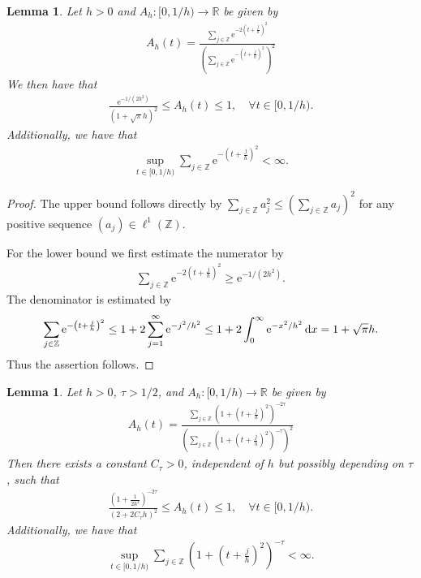 \documentclass{article}
\renewcommand{\d}{\, \textup{d}}
\newtheorem{lemma}[theorem]{Lemma}
\newcommand{\R}{\mathbb{R}}
\newcommand{\Z}{\mathbb{Z}}
\newcommand{\e}{\mathrm{e}}
\begin{document}
\begin{appendices}
\begin{lemma}\label{lem:Gaussianupperandlowerbound}
Let $h>0$ and $A_h:[0,1/h) \to \R$ be given by  
\begin{align*}
    A_h(t)=\frac{\sum_{j \in \Z} \e^{-2\left(t+\frac{j}{h}\right)^2}}{\left(\sum_{j \in \Z} \e^{-\left(t+\frac{j}{h} \right)^2} \right)^2}
\end{align*}
We then have that 
\begin{align*}
    \frac{\e^{-1/(2h^2)}}{(1+\sqrt{\pi}h)^2} \leq A_h(t) \leq 1, \quad \forall t \in[0,1/h).
\end{align*}
Additionally, we have that
\begin{align*}
    \sup_{t \in [0,1/h)} \sum_{j \in \Z} \e^{-\left(t+\frac{j}{h} \right)^2} < \infty.
\end{align*}
\end{lemma}
\begin{proof}
    The upper bound follows directly by $\sum_{j \in \Z} a_j^2 \leq \left( \sum_{j \in \Z} a_j\right)^2$ for any positive sequence $(a_j) \in \ell^1(\Z)$. 

    For the lower bound we first estimate the numerator by 
    \begin{align*}
        \sum_{j \in \Z} \e^{-2\left(t+\frac{j}{h}\right)^2} \geq \e^{-1/(2h^2)}. 
    \end{align*}
    The denominator is estimated by 
    \begin{align*}
        \sum_{j \in \Z} \e^{-\left(t+\frac{j}{h} \right)^2} \leq 1+2 \sum_{j=1}^\infty \e^{-j^2/h^2} \leq 1 + 2 \int_0^\infty \e^{-x^2/h^2} \d x = 1+ \sqrt{\pi} h.
    \end{align*}
Thus the assertion follows.
\end{proof}

\begin{lemma}\label{lem:Sobolevupperandlowerbound}
Let $h>0$, $\tau>1/2$, and $A_h:[0,1/h) \to \R$ be given by
\begin{align*}
    A_h(t)= \frac{\sum_{j \in \Z} \left(1+\left(t+\frac{j}{h}\right)^2\right)^{-2\tau}}{\left(\sum_{j \in \Z} \left( 1+\left(t+\frac{j}{h}\right)^2\right)^{-\tau} \right)^2}
\end{align*}    
Then there exists a constant $C_\tau>0$, independent of $h$ but possibly depending on $\tau$, such that
\begin{align*}
\frac{\left( 1+ \frac{1}{2h^2} \right)^{-2\tau}}{(2+2C_\tau h)^2}    \leq A_h(t) \leq 1, \quad \forall t \in [0,1/h).
\end{align*}
Additionally, we have that
\begin{align*}
    \sup_{t \in [0,1/h)} \sum_{j \in \Z} \left( 1+\left(t+\frac{j}{h}\right)^2\right)^{-\tau} < \infty.
\end{align*}


\end{lemma}
\end{appendices}
\end{document}
